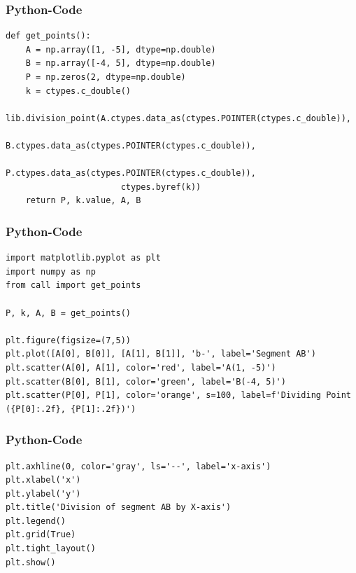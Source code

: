 \documentclass{beamer}
\begin{document}
\begin{frame}[fragile]
\frametitle{Python-Code}
\begin{lstlisting}
def get_points():
    A = np.array([1, -5], dtype=np.double)
    B = np.array([-4, 5], dtype=np.double)
    P = np.zeros(2, dtype=np.double)
    k = ctypes.c_double()
    lib.division_point(A.ctypes.data_as(ctypes.POINTER(ctypes.c_double)),
                       B.ctypes.data_as(ctypes.POINTER(ctypes.c_double)),
                       P.ctypes.data_as(ctypes.POINTER(ctypes.c_double)),
                       ctypes.byref(k))
    return P, k.value, A, B
\end{lstlisting}
\end{frame}

\begin{frame}[fragile]
\frametitle{Python-Code}
\begin{lstlisting}
import matplotlib.pyplot as plt
import numpy as np
from call import get_points

P, k, A, B = get_points()

plt.figure(figsize=(7,5))
plt.plot([A[0], B[0]], [A[1], B[1]], 'b-', label='Segment AB')
plt.scatter(A[0], A[1], color='red', label='A(1, -5)')
plt.scatter(B[0], B[1], color='green', label='B(-4, 5)')
plt.scatter(P[0], P[1], color='orange', s=100, label=f'Dividing Point ({P[0]:.2f}, {P[1]:.2f})')

\end{lstlisting}
\end{frame}

\begin{frame}[fragile]
\frametitle{Python-Code}
\begin{lstlisting}
plt.axhline(0, color='gray', ls='--', label='x-axis')
plt.xlabel('x')
plt.ylabel('y')
plt.title('Division of segment AB by X-axis')
plt.legend()
plt.grid(True)
plt.tight_layout()
plt.show()

\end{lstlisting}
\end{frame}
\end{document}
